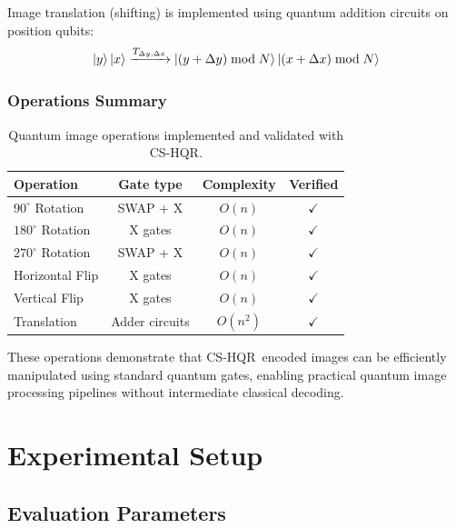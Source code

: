 \documentclass{ipol}
\newcommand{\cshqr}{\textsc{CS-HQR}}
\begin{document}
Image translation (shifting) is implemented using quantum addition circuits
on position qubits:
\begin{equation}
\ket{y}\ket{x} \xrightarrow{T_{\Delta y, \Delta x}}
  \ket{(y + \Delta y) \bmod N}\ket{(x + \Delta x) \bmod N}
\label{eq:translation}
\end{equation}

\FloatBarrier
\subsubsection{Operations Summary}

\begin{table}[H]
\begin{center}
\begin{tabular}{lccc}
\hline
Operation & Gate type & Complexity & Verified \\
\hline
$90^\circ$ Rotation  & SWAP + X & $O(n)$ & $\checkmark$ \\
$180^\circ$ Rotation & X gates  & $O(n)$ & $\checkmark$ \\
$270^\circ$ Rotation & SWAP + X & $O(n)$ & $\checkmark$ \\
Horizontal Flip      & X gates  & $O(n)$ & $\checkmark$ \\
Vertical Flip        & X gates  & $O(n)$ & $\checkmark$ \\
Translation          & Adder circuits & $O(n^2)$ & $\checkmark$ \\
\hline
\end{tabular}
\caption{Quantum image operations implemented and validated with \cshqr.}
\label{tab:quantum_operations}
\end{center}
\end{table}

These operations demonstrate that \cshqr\ encoded images can be efficiently
manipulated using standard quantum gates, enabling practical quantum image
processing pipelines without intermediate classical decoding.

\FloatBarrier
\section{Experimental Setup}
\label{sec:experimental_setup}

\FloatBarrier
\subsection{Evaluation Parameters}
\label{subsec:evaluation_params}
\end{document}
